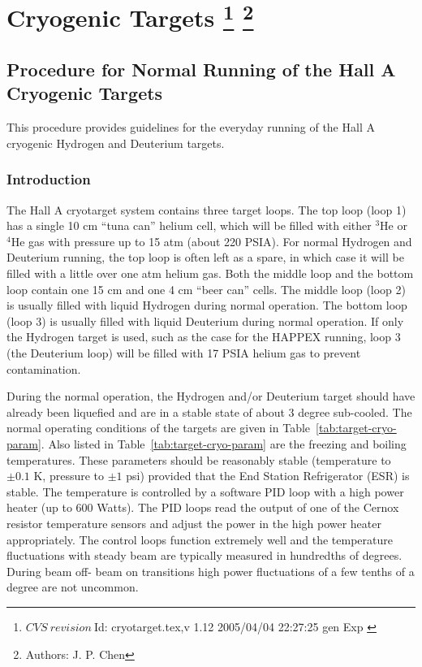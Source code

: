 \chapter[Cryogenic Targets]{Cryogenic Targets
\footnote{
  $CVS~revision~ $Id: cryotarget.tex,v 1.12 2005/04/04 22:27:25 gen Exp $ $ }
\footnote{Authors: J. P. Chen }
}

\section{Procedure for Normal Running of the Hall A Cryogenic Targets}
This procedure provides guidelines for the everyday running of the Hall A
cryogenic Hydrogen and Deuterium targets.

\subsection{Introduction }
The Hall A cryotarget system contains three target loops. The top loop (loop 1)
has a single 10 cm ``tuna can'' helium cell, which will be filled with either 
$^3$He or $^4$He gas with pressure up to 15 atm (about 220 PSIA). For 
normal Hydrogen and Deuterium running, the top loop is often left as a spare,
in which 
case it will be filled with a little over one atm helium gas. Both the middle 
loop and the bottom loop contain one 15 cm and one 4 cm  ``beer can'' cells.
The middle loop (loop 2) is usually filled with liquid Hydrogen during normal 
operation.
The bottom loop (loop 3) is usually filled with liquid Deuterium during normal
operation. If only the Hydrogen target is used, such as the case for   
the HAPPEX running, loop 3 (the Deuterium loop) 
will be filled with 17 PSIA helium gas to prevent contamination.

\par
During the normal operation, the Hydrogen and/or Deuterium target should
have already been liquefied and are in a stable state of 
about 3 degree sub-cooled. 
The normal operating conditions of the targets are given in Table~\ref{tab:target-cryo-param}.
Also listed in Table~\ref{tab:target-cryo-param} are the freezing and boiling temperatures.
These parameters should be reasonably stable (temperature to $\pm 0.1$ K, 
pressure to $\pm 1$ psi) provided that the End Station
Refrigerator (ESR) is stable. The
temperature is controlled by a software PID loop with a high power heater (up
to 600 Watts). The PID loops read the output of one
of the Cernox resistor temperature sensors and adjust the power in the high 
power heater appropriately. 
The control loops function extremely well and the temperature fluctuations with
steady beam are typically measured in hundredths of degrees. During beam off-
beam on transitions high power fluctuations of a few tenths of a degree are
not uncommon.

